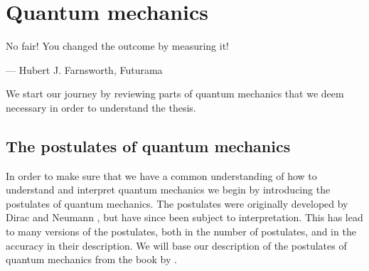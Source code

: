 \chapter{Quantum mechanics}
    \epigraph{No fair! You changed the outcome by measuring it!}
    {--- Hubert J. Farnsworth, Futurama}

    We start our journey by reviewing parts of quantum mechanics that we deem
    necessary in order to understand the thesis.

    \section{The postulates of quantum mechanics}
        In order to make sure that we have a common understanding of how to
        understand and interpret quantum mechanics we begin by introducing the
        postulates of quantum mechanics.
        The postulates were originally developed by Dirac
        \cite{dirac1981principles} and Neumann \cite{von2018mathematical},
        but have since been subject to interpretation.
        This has lead to many versions of the postulates, both in the number of
        postulates, and in the accuracy in their description.
        We will base our description of the postulates of quantum mechanics from
        the book  by
        \citeauthor{salasnich2017quantum} \cite{salasnich2017quantum}.

